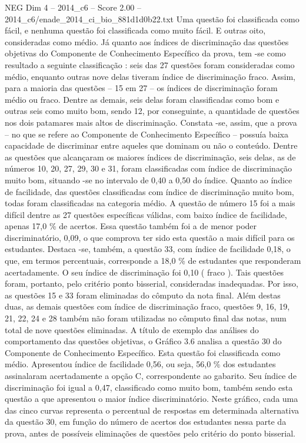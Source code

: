 \begin{textsample}{NEG Dim 4 – 2014\_c6 – Score 2.00 – 2014\_c6/enade\_2014\_ci\_bio\_881d1d0b22.txt}
Uma questão foi classificada como fácil, e nenhuma questão foi classificada como muito fácil.
E outras oito, consideradas como médio.
Já quanto aos índices de discriminação das questões objetivas do Componente de Conhecimento Específico da prova, tem -se como resultado a seguinte classificação : seis das 27 questões foram consideradas como médio, enquanto outras nove delas tiveram índice de discriminação fraco.
Assim, para a maioria das questões – 15 em 27 – os índices de discriminação foram médio ou fraco.
Dentre as demais, seis delas foram classificadas como bom e outras seis como muito bom, sendo 12, por conseguinte, a quantidade de questões nos dois patamares mais altos de discriminação.
Constata -se, assim, que a prova – no que se refere ao Componente de Conhecimento Específico – possuía baixa capacidade de discriminar entre aqueles que dominam ou não o conteúdo.
Dentre as questões que alcançaram os maiores índices de discriminação, seis delas, as de números 10, 20, 27, 29, 30 e 31, foram classificadas com índice de discriminação muito bom, situando -se no intervalo de 0,40 a 0,50 do índice.
Quanto ao índice de facilidade, das questões classificadas com índice de discriminação muito bom, todas foram classificadas na categoria médio.
A questão de número 15 foi a mais difícil dentre as 27 questões específicas válidas, com baixo índice de facilidade, apenas 17,0 \% de acertos.
Essa questão também foi a de menor poder discriminatório, 0,09, o que comprova ter sido esta questão a mais difícil para os estudantes.
Destaca -se, também, a questão 33, com índice de facilidade 0,18, o que, em termos percentuais, corresponde a 18,0 \% de estudantes que responderam acertadamente.
O seu índice de discriminação foi 0,10 ( fraco ).
Tais questões foram, portanto, pelo critério ponto bisserial, consideradas inadequadas.
Por isso, as questões 15 e 33 foram eliminadas do cômputo da nota final.
Além destas duas, as demais questões com índice de discriminação fraco, questões 9, 16, 19, 21, 22, 24 e 28 também não foram utilizadas no cômputo final das notas, num total de nove questões eliminadas.
A título de exemplo das análises do comportamento das questões objetivas, o Gráfico 3.6 analisa a questão 30 do Componente de Conhecimento Específico.
Esta questão foi classificada como médio.
Apresentou índice de facilidade 0,56, ou seja, 56,0 \% dos estudantes assinalaram acertadamente a opção C, correspondente ao gabarito.
Seu índice de discriminação foi igual a 0,47, classificado como muito bom, também sendo esta questão a que apresentou o maior índice discriminatório.
Neste gráfico, cada uma das cinco curvas representa o percentual de respostas em determinada alternativa da questão 30, em função do número de acertos dos estudantes nessa parte da prova, antes de possíveis eliminações de questões pelo critério do ponto bisserial.

\end{textsample}
